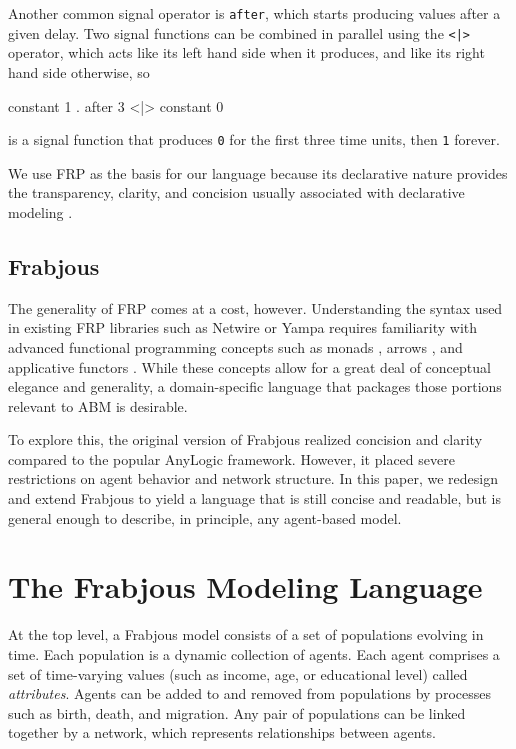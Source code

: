 \documentclass[oribibl]{llncs}
\begin{document}
  Another common signal operator is \lstinline{after}, which starts producing values after a given delay. Two signal functions can be combined in parallel using the \lstinline{<|> } operator, which acts like its left hand side when it produces, and like its right hand side otherwise, so 
\begin{code}
	constant 1 . after 3 <|> constant 0
\end{code}
is a signal function that produces \lstinline{0} for the first three time units, then \lstinline{1} forever. 
  
  We use FRP as the basis for our language because its declarative nature provides the transparency, clarity, and concision usually associated with declarative modeling \cite{system_dyn_approaches, system_dyn_tradeoffs}.
  
\subsection{Frabjous}
  
  The generality of FRP comes at a cost, however. Understanding the syntax used in existing FRP libraries such as Netwire or Yampa \cite{yampa} requires familiarity with advanced functional programming concepts such as monads \cite{monads}, arrows \cite{mon2arr}, and applicative functors \cite{applicative}. While these concepts allow for a great deal of conceptual elegance and generality, a domain-specific language that packages those portions relevant to ABM is desirable. 
  
  To explore this, the original version of Frabjous\cite{frabjous} realized concision and clarity compared to the popular AnyLogic framework. However, it placed severe restrictions on agent behavior and network structure. In this paper, we redesign and extend Frabjous to yield a language that is still concise and readable, but is general enough to describe, in principle, any agent-based model.
  
\section{The Frabjous Modeling Language}

At the top level, a Frabjous model consists of a set of populations evolving in time. Each population is a dynamic collection of agents. Each agent comprises a set of time-varying values (such as income, age, or educational level) called \emph{attributes}. Agents can be added to and removed from populations by processes such as birth, death, and migration. Any pair of populations can be linked together by a network, which represents relationships between agents.
\end{document}
